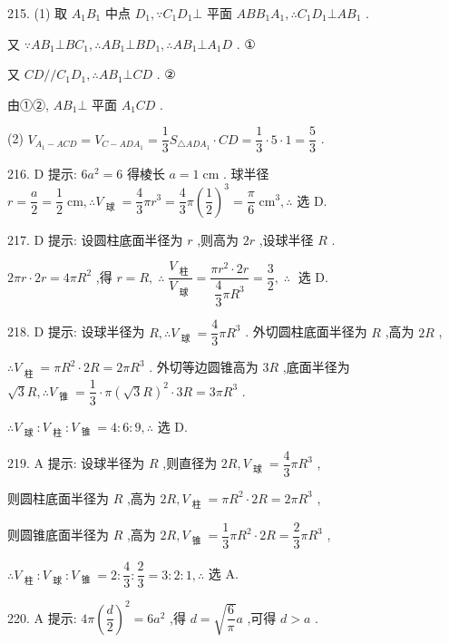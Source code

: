 215. (1) 取 ${A}_{1}{B}_{1}$ 中点 ${D}_{1},\because {C}_{1}{D}_{1} \bot$ 平面 ${AB}{B}_{1}{A}_{1},\therefore {C}_{1}{D}_{1} \bot  A{B}_{1}$ .

又 $\because A{B}_{1} \bot  B{C}_{1},\therefore A{B}_{1} \bot  B{D}_{1},\therefore A{B}_{1} \bot  {A}_{1}D$ . ①

又 ${CD}//{C}_{1}{D}_{1},\therefore A{B}_{1} \bot  {CD}$ . ②

由①②, $A{B}_{1}\bot$ 平面 ${A}_{1}{CD}$ .

(2) ${V}_{{A}_{1} - {ACD}} = {V}_{C - {AD}{A}_{1}} = \dfrac{1}{3}{S}_{\bigtriangleup {AD}{A}_{1}} \cdot  {CD} = \dfrac{1}{3} \cdot  5 \cdot  1 = \dfrac{5}{3}$ .

216. D 提示: $6{a}^{2} = 6$ 得棱长 $a = 1\mathrm{\;{cm}}$ . 球半径 $r = \dfrac{a}{2} = \dfrac{1}{2}\mathrm{\;{cm}},\therefore {V}_{\text{ 球 }} = \dfrac{4}{3}\pi {r}^{3} = \dfrac{4}{3}\pi {\left( \dfrac{1}{2}\right) }^{3} = \dfrac{\pi }{6}{\mathrm{\;{cm}}}^{3},\therefore$ 选 D.

217. D 提示: 设圆柱底面半径为 $r$ ,则高为 ${2r}$ ,设球半径 $R$ .

${2\pi r} \cdot  {2r} = {4\pi }{R}^{2}$ ,得 $r = R,\;\therefore \;\dfrac{{V}_{\text{ 柱 }}}{{V}_{\text{ 球 }}} = \dfrac{\pi {r}^{2} \cdot  {2r}}{\dfrac{4}{3}\pi {R}^{3}} = \dfrac{3}{2},\;\therefore \;$ 选 D.

218. D 提示: 设球半径为 $R,\therefore {V}_{\text{ 球 }} = \dfrac{4}{3}\pi {R}^{3}$ . 外切圆柱底面半径为 $R$ ,高为 ${2R}$ ,

$\therefore {V}_{\text{ 柱 }} = \pi {R}^{2} \cdot  {2R} = {2\pi }{R}^{3}$ . 外切等边圆锥高为 ${3R}$ ,底面半径为 $\sqrt{3}R,\therefore {V}_{\text{ 锥 }} = \dfrac{1}{3} \cdot  \pi {\left( \sqrt{3}R\right) }^{2} \cdot  {3R} = {3\pi }{R}^{3}$ .

$\therefore {V}_{\text{ 球 }} : {V}_{\text{ 柱 }} : {V}_{\text{ 锥 }} = 4 : 6 : 9,\therefore$ 选 D.

219. A 提示: 设球半径为 $R$ ,则直径为 ${2R},{V}_{\text{ 球 }} = \dfrac{4}{3}\pi {R}^{3}$ ,

则圆柱底面半径为 $R$ ,高为 ${2R},{V}_{\text{ 柱 }} = \pi {R}^{2} \cdot  {2R} = {2\pi }{R}^{3}$ ,

则圆锥底面半径为 $R$ ,高为 ${2R},{V}_{\text{ 锥 }} = \dfrac{1}{3}\pi {R}^{2} \cdot  {2R} = \dfrac{2}{3}\pi {R}^{3}$ ,

$\therefore {V}_{\text{ 柱 }} : {V}_{\text{ 球 }} : {V}_{\text{ 锥 }} = 2 : \dfrac{4}{3} : \dfrac{2}{3} = 3 : 2 : 1,\therefore$ 选 A.

220. A 提示: ${4\pi }{\left( \dfrac{d}{2}\right) }^{2} = 6{a}^{2}$ ,得 $d = \sqrt{\dfrac{6}{\pi }}a$ ,可得 $d > a$ .

